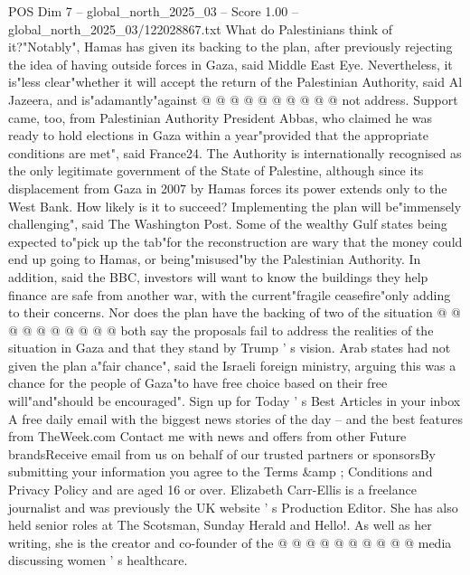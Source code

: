 \begin{textsample}{POS Dim 7 – global\_north\_2025\_03 – Score 1.00 – global\_north\_2025\_03/122028867.txt}
What do Palestinians think of it?"Notably", Hamas has given its backing to the plan, after previously rejecting the idea of having outside forces in Gaza, said Middle East Eye.
Nevertheless, it is"less clear"whether it will accept the return of the Palestinian Authority, said Al Jazeera, and is"adamantly"against @ @ @ @ @ @ @ @ @ @ not address.
Support came, too, from Palestinian Authority President Abbas, who claimed he was ready to hold elections in Gaza within a year"provided that the appropriate conditions are met", said France24.
The Authority is internationally recognised as the only legitimate government of the State of Palestine, although since its displacement from Gaza in 2007 by Hamas forces its power extends only to the West Bank.
How likely is it to succeed?
Implementing the plan will be"immensely challenging", said The Washington Post.
Some of the wealthy Gulf states being expected to"pick up the tab"for the reconstruction are wary that the money could end up going to Hamas, or being"misused"by the Palestinian Authority.
In addition, said the BBC, investors will want to know the buildings they help finance are safe from another war, with the current"fragile ceasefire"only adding to their concerns.
Nor does the plan have the backing of two of the situation @ @ @ @ @ @ @ @ @ @ both say the proposals fail to address the realities of the situation in Gaza and that they stand by Trump ' s vision.
Arab states had not given the plan a"fair chance", said the Israeli foreign ministry, arguing this was a chance for the people of Gaza"to have free choice based on their free will"and"should be encouraged".
Sign up for Today ' s Best Articles in your inbox A free daily email with the biggest news stories of the day -- and the best features from TheWeek.com Contact me with news and offers from other Future brandsReceive email from us on behalf of our trusted partners or sponsorsBy submitting your information you agree to the Terms \&amp ; Conditions and Privacy Policy and are aged 16 or over.
Elizabeth Carr-Ellis is a freelance journalist and was previously the UK website ' s Production Editor.
She has also held senior roles at The Scotsman, Sunday Herald and Hello!.
As well as her writing, she is the creator and co-founder of the @ @ @ @ @ @ @ @ @ @ media discussing women ' s healthcare.

\end{textsample}
